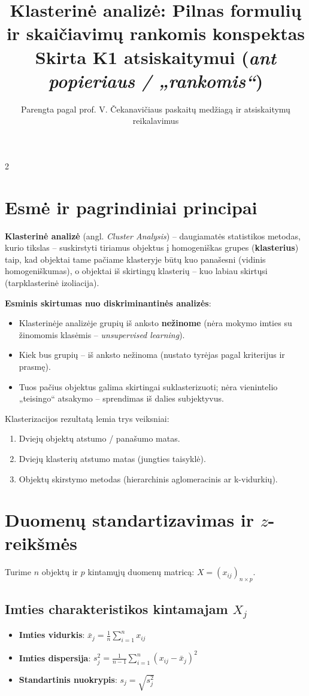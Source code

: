 \documentclass[9pt,a4paper]{article}
\title{\vspace{-1.2cm}\Large\textbf{Klasterinė analizė: Pilnas formulių ir skaičiavimų rankomis konspektas}\\\large Skirta K1 atsiskaitymui (\textit{ant popieriaus / „rankomis“})\vspace{-0.5cm}}
\author{Parengta pagal prof. V. Čekanavičiaus paskaitų medžiagą ir atsiskaitymų reikalavimus}
\date{}
\begin{document}
\maketitle
\thispagestyle{fancy}

\begin{multicols*}{2}

\section{Esmė ir pagrindiniai principai}
\textbf{Klasterinė analizė} (angl. \textit{Cluster Analysis}) -- daugiamatės statistikos metodas, kurio tikslas -- suskirstyti tiriamus objektus į homogeniškas grupes (\textbf{klasterius}) taip, kad objektai tame pačiame klasteryje būtų kuo panašesni (vidinis homogeniškumas), o objektai iš skirtingų klasterių -- kuo labiau skirtųsi (tarpklasterinė izoliacija).

\textbf{Esminis skirtumas nuo diskriminantinės analizės}:
\begin{itemize}
    \item Klasterinėje analizėje grupių iš anksto \textbf{nežinome} (nėra mokymo imties su žinomomis klasėmis -- \textit{unsupervised learning}).
    \item Kiek bus grupių -- iš anksto nežinoma (nustato tyrėjas pagal kriterijus ir prasmę).
    \item Tuos pačius objektus galima skirtingai suklasterizuoti; nėra vienintelio „teisingo“ atsakymo -- sprendimas iš dalies subjektyvus.
\end{itemize}

Klasterizacijos rezultatą lemia trys veiksniai:
\begin{enumerate}
    \item Dviejų objektų atstumo / panašumo matas.
    \item Dviejų klasterių atstumo matas (jungties taisyklė).
    \item Objektų skirstymo metodas (hierarchinis aglomeracinis ar k-vidurkių).
\end{enumerate}

\section{Duomenų standartizavimas ir $z$-reikšmės}
Turime $n$ objektų ir $p$ kintamųjų duomenų matricą: $X = (x_{ij})_{n \times p}$.

\subsection{Imties charakteristikos kintamajam $X_j$}
\begin{itemize}
    \item \textbf{Imties vidurkis}: $\bar{x}_j = \frac{1}{n}\sum_{i=1}^n x_{ij}$
    \item \textbf{Imties dispersija}: $s_j^2 = \frac{1}{n-1}\sum_{i=1}^n (x_{ij} - \bar{x}_j)^2$
    \item \textbf{Standartinis nuokrypis}: $s_j = \sqrt{s_j^2}$
\end{itemize}


\end{multicols*}
\end{document}
